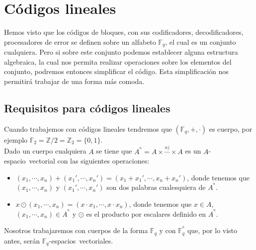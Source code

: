 %
%

\chapter{C\'odigos lineales}

Hemos visto que los c\'odigos de bloques, con sus codificadores,
decodificadores, procesadores de error se definen sobre un alfabeto
$\mathbb{F}_q$, el cual es un conjunto cualquiera. Pero si sobre este
conjunto podemos establecer alguna estructura algebraica, la cual nos permita
realizar operaciones sobre los elementos del conjunto, podremos entonces
simplificar el c\'odigo. Esta simplificaci\'on nos permitir\'a trabajar de
una forma m\'as comoda.

\section{Requisitos para c\'odigos lineales}

Cuando trabajemos con c\'odigos lineales tendremos que $(\mathbb{F}_q,+,\cdot)$
es cuerpo, por ejemplo $\mathbb{F}_2=\mathbb{Z}/2=\mathbb{Z}_2=\{0,1\}$.\\

Dado un cuerpo cualquiera $A$ se tiene que $A^{^n}=A\times \stackrel{n)}\cdots
\times A$ es un \mbox{$A$-espacio vectorial} con las siguientes operaciones:
\begin{itemize}
\item $(x_1,\cdots,x_n)+(x_1',\cdots,x_n')=(x_1+x_1',\cdots,x_n+x_n')$, donde
tenemos que $(x_1,\cdots,x_n)$ y $(x_1',\cdots,x_n')$ son dos palabras
cualesquiera de $A^{^n}$.
\item $x\odot (x_1,\cdots,x_n)=(x\cdot x_1,\cdots, x\cdot x_n)$, donde
tenemos que $x\in A$, $(x_1,\cdots,x_n)\in A^{^n}$ y $\odot$ es el producto
por escalares definido en $A^{^n}$.
\end{itemize}
Nosotros trabajaremos con cuerpos de la forma $\mathbb{F}_q$ y con
$\mathbb{F}^{^n}_q$ que, por lo visto antes, ser\'an
\mbox{$\mathbb{F}_q$-espacios vectoriales}.

%
%



%
%



%
%



%
%



%
%



%
%



%
%

